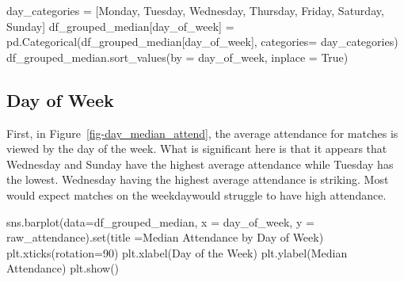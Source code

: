\documentclass[
  letterpaper,
  DIV=11,
  numbers=noendperiod]{scrartcl}
\newenvironment{Shaded}{\begin{snugshade}}{\end{snugshade}}
\newcommand{\BuiltInTok}[1]{\textcolor[rgb]{0.00,0.23,0.31}{#1}}
\newcommand{\DecValTok}[1]{\textcolor[rgb]{0.68,0.00,0.00}{#1}}
\newcommand{\NormalTok}[1]{\textcolor[rgb]{0.00,0.23,0.31}{#1}}
\newcommand{\OperatorTok}[1]{\textcolor[rgb]{0.37,0.37,0.37}{#1}}
\newcommand{\StringTok}[1]{\textcolor[rgb]{0.13,0.47,0.30}{#1}}
\newcommand{\VariableTok}[1]{\textcolor[rgb]{0.07,0.07,0.07}{#1}}
\begin{document}
\begin{Shaded}
\begin{Highlighting}[]
\NormalTok{day\_categories }\OperatorTok{=}\NormalTok{ [}\StringTok{\textquotesingle{}Monday\textquotesingle{}}\NormalTok{, }\StringTok{\textquotesingle{}Tuesday\textquotesingle{}}\NormalTok{, }\StringTok{\textquotesingle{}Wednesday\textquotesingle{}}\NormalTok{, }\StringTok{\textquotesingle{}Thursday\textquotesingle{}}\NormalTok{, }\StringTok{\textquotesingle{}Friday\textquotesingle{}}\NormalTok{, }\StringTok{\textquotesingle{}Saturday\textquotesingle{}}\NormalTok{, }\StringTok{\textquotesingle{}Sunday\textquotesingle{}}\NormalTok{]}
\NormalTok{df\_grouped\_median[}\StringTok{\textquotesingle{}day\_of\_week\textquotesingle{}}\NormalTok{] }\OperatorTok{=}\NormalTok{ pd.Categorical(df\_grouped\_median[}\StringTok{\textquotesingle{}day\_of\_week\textquotesingle{}}\NormalTok{], categories}\OperatorTok{=}\NormalTok{ day\_categories)}
\NormalTok{df\_grouped\_median.sort\_values(by }\OperatorTok{=} \StringTok{\textquotesingle{}day\_of\_week\textquotesingle{}}\NormalTok{, inplace }\OperatorTok{=} \VariableTok{True}\NormalTok{)}
\end{Highlighting}
\end{Shaded}

\hypertarget{day-of-week}{%
\subsection{Day of Week}\label{day-of-week}}

First, in Figure~\ref{fig-day_median_attend}, the average attendance for
matches is viewed by the day of the week. What is significant here is
that it appears that Wednesday and Sunday have the highest average
attendance while Tuesday has the lowest. Wednesday having the highest
average attendance is striking. Most would expect matches on the
weekdaywould struggle to have high attendance.

\begin{Shaded}
\begin{Highlighting}[]
\NormalTok{sns.barplot(data}\OperatorTok{=}\NormalTok{df\_grouped\_median, x }\OperatorTok{=} \StringTok{\textquotesingle{}day\_of\_week\textquotesingle{}}\NormalTok{, y }\OperatorTok{=} \StringTok{\textquotesingle{}raw\_attendance\textquotesingle{}}\NormalTok{).}\BuiltInTok{set}\NormalTok{(title }\OperatorTok{=}\StringTok{\textquotesingle{}Median  Attendance by Day of Week\textquotesingle{}}\NormalTok{)}
\NormalTok{plt.xticks(rotation}\OperatorTok{=}\DecValTok{90}\NormalTok{)}
\NormalTok{plt.xlabel(}\StringTok{\textquotesingle{}Day of the Week\textquotesingle{}}\NormalTok{)}
\NormalTok{plt.ylabel(}\StringTok{\textquotesingle{}Median Attendance\textquotesingle{}}\NormalTok{)}
\NormalTok{plt.show()}
\end{Highlighting}
\end{Shaded}
\end{document}
